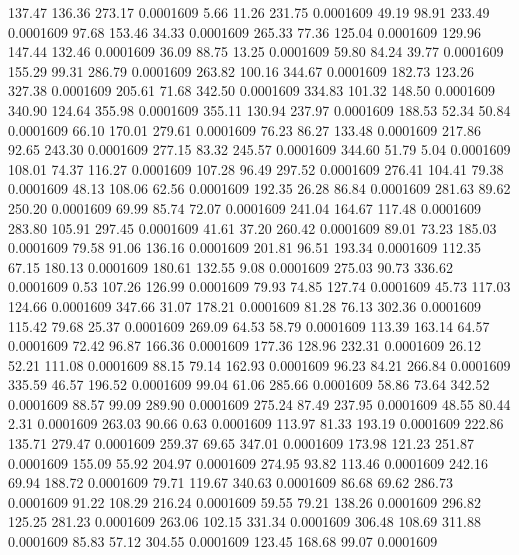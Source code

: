  137.47  136.36  273.17   0.0001609
   5.66   11.26  231.75   0.0001609
  49.19   98.91  233.49   0.0001609
  97.68  153.46   34.33   0.0001609
 265.33   77.36  125.04   0.0001609
 129.96  147.44  132.46   0.0001609
  36.09   88.75   13.25   0.0001609
  59.80   84.24   39.77   0.0001609
 155.29   99.31  286.79   0.0001609
 263.82  100.16  344.67   0.0001609
 182.73  123.26  327.38   0.0001609
 205.61   71.68  342.50   0.0001609
 334.83  101.32  148.50   0.0001609
 340.90  124.64  355.98   0.0001609
 355.11  130.94  237.97   0.0001609
 188.53   52.34   50.84   0.0001609
  66.10  170.01  279.61   0.0001609
  76.23   86.27  133.48   0.0001609
 217.86   92.65  243.30   0.0001609
 277.15   83.32  245.57   0.0001609
 344.60   51.79    5.04   0.0001609
 108.01   74.37  116.27   0.0001609
 107.28   96.49  297.52   0.0001609
 276.41  104.41   79.38   0.0001609
  48.13  108.06   62.56   0.0001609
 192.35   26.28   86.84   0.0001609
 281.63   89.62  250.20   0.0001609
  69.99   85.74   72.07   0.0001609
 241.04  164.67  117.48   0.0001609
 283.80  105.91  297.45   0.0001609
  41.61   37.20  260.42   0.0001609
  89.01   73.23  185.03   0.0001609
  79.58   91.06  136.16   0.0001609
 201.81   96.51  193.34   0.0001609
 112.35   67.15  180.13   0.0001609
 180.61  132.55    9.08   0.0001609
 275.03   90.73  336.62   0.0001609
   0.53  107.26  126.99   0.0001609
  79.93   74.85  127.74   0.0001609
  45.73  117.03  124.66   0.0001609
 347.66   31.07  178.21   0.0001609
  81.28   76.13  302.36   0.0001609
 115.42   79.68   25.37   0.0001609
 269.09   64.53   58.79   0.0001609
 113.39  163.14   64.57   0.0001609
  72.42   96.87  166.36   0.0001609
 177.36  128.96  232.31   0.0001609
  26.12   52.21  111.08   0.0001609
  88.15   79.14  162.93   0.0001609
  96.23   84.21  266.84   0.0001609
 335.59   46.57  196.52   0.0001609
  99.04   61.06  285.66   0.0001609
  58.86   73.64  342.52   0.0001609
  88.57   99.09  289.90   0.0001609
 275.24   87.49  237.95   0.0001609
  48.55   80.44    2.31   0.0001609
 263.03   90.66    0.63   0.0001609
 113.97   81.33  193.19   0.0001609
 222.86  135.71  279.47   0.0001609
 259.37   69.65  347.01   0.0001609
 173.98  121.23  251.87   0.0001609
 155.09   55.92  204.97   0.0001609
 274.95   93.82  113.46   0.0001609
 242.16   69.94  188.72   0.0001609
  79.71  119.67  340.63   0.0001609
  86.68   69.62  286.73   0.0001609
  91.22  108.29  216.24   0.0001609
  59.55   79.21  138.26   0.0001609
 296.82  125.25  281.23   0.0001609
 263.06  102.15  331.34   0.0001609
 306.48  108.69  311.88   0.0001609
  85.83   57.12  304.55   0.0001609
 123.45  168.68   99.07   0.0001609
